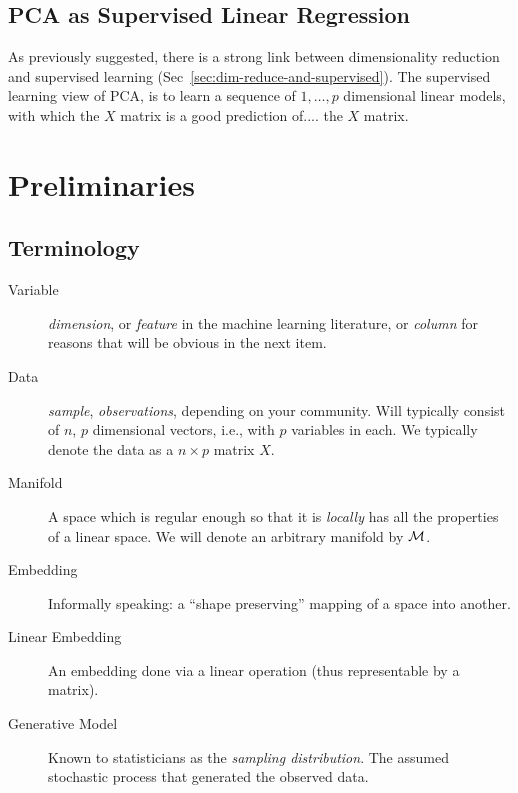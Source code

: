 \documentclass[12pt,a4paper]{article}
\begin{document}
\subsection{PCA as Supervised Linear Regression}
As previously suggested, there is a strong link between dimensionality reduction and supervised learning (Sec~\ref{sec:dim-reduce-and-supervised}).
The supervised learning view of PCA, is to learn a sequence of $1,\dots,p$ dimensional linear models, with which the $X$ matrix is a good prediction of.... the $X$ matrix. 









\section{Preliminaries}

\subsection{Terminology}

\begin{tcolorbox}
	\begin{description}
		
		\item[Variable] \Aka \emph{dimension}, or \emph{feature} in the machine learning literature, or \emph{column} for reasons that will be obvious in the next item. 
		
		\item[Data] \Aka \emph{sample}, \emph{observations}, depending on your community. 
		Will typically consist of $n$, $p$ dimensional vectors, i.e., with $p$ variables in each.
		We typically denote the data as a $n\times p$ matrix $X$. 
		
		\item[Manifold] A space which is regular enough so that it is \emph{locally} has all the properties of a linear space. 
		We will denote an arbitrary manifold by $\mathcal{M}$.
		
		
		\item[Embedding] Informally speaking: a ``shape preserving'' mapping of a space into another. 
		
		\item[Linear Embedding] An embedding done via a linear operation (thus representable by a matrix). 
		
		\item[Generative Model] Known to statisticians as the \emph{sampling distribution}. 
		The assumed stochastic process that generated the observed data. 
		
	\end{description}
\end{tcolorbox}
\end{document}
